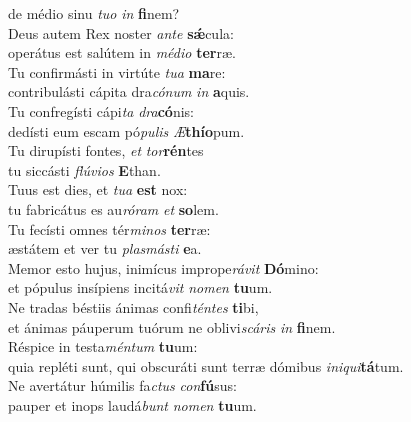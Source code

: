 \evenverse de médio sinu \textit{tu}\textit{o} \textit{in} \textbf{fi}nem?\\
\oddverse Deus autem Rex noster \textit{an}\textit{te} \textbf{sǽ}cula:~\*\\
\oddverse operátus est salútem in \textit{mé}\textit{di}\textit{o} \textbf{ter}ræ.\\
\evenverse Tu confirmásti in virtúte \textit{tu}\textit{a} \textbf{ma}re:~\*\\
\evenverse contribulásti cápita dra\textit{có}\textit{num} \textit{in} \textbf{a}quis.\\
\oddverse Tu confregísti cápi\textit{ta} \textit{dra}\textbf{có}nis:~\*\\
\oddverse dedísti eum escam pó\textit{pu}\textit{lis} \textit{Æ}\textbf{thí}\textbf{o}pum.\\
\evenverse Tu dirupísti fontes, \textit{et} \textit{tor}\textbf{rén}tes~\*\\
\evenverse tu siccásti \textit{flú}\textit{vi}\textit{os} \textbf{E}than.\\
\oddverse Tuus est dies, et \textit{tu}\textit{a} \textbf{est} nox:~\*\\
\oddverse tu fabricátus es au\textit{ró}\textit{ram} \textit{et} \textbf{so}lem.\\
\evenverse Tu fecísti omnes tér\textit{mi}\textit{nos} \textbf{ter}ræ:~\*\\
\evenverse æstátem et ver tu \textit{plas}\textit{má}\textit{sti} \textbf{e}a.\\
\oddverse Memor esto hujus, inimícus imprope\textit{rá}\textit{vit} \textbf{Dó}mino:~\*\\
\oddverse et pópulus insípiens incitá\textit{vit} \textit{no}\textit{men} \textbf{tu}um.\\
\evenverse Ne tradas béstiis ánimas confi\textit{tén}\textit{tes} \textbf{ti}bi,~\*\\
\evenverse et ánimas páuperum tuórum ne oblivi\textit{scá}\textit{ris} \textit{in} \textbf{fi}nem.\\
\oddverse Réspice in testa\textit{mén}\textit{tum} \textbf{tu}um:~\*\\
\oddverse quia repléti sunt, qui obscuráti sunt terræ dómibus \textit{i}\textit{ni}\textit{qui}\textbf{tá}tum.\\
\evenverse Ne avertátur húmilis fa\textit{ctus} \textit{con}\textbf{fú}sus:~\*\\
\evenverse pauper et inops laudá\textit{bunt} \textit{no}\textit{men} \textbf{tu}um.\\
